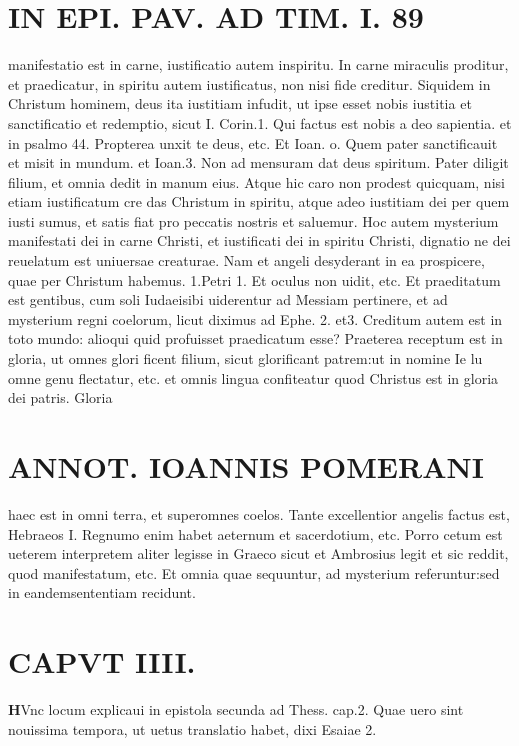 \documentclass{article}
\begin{document}
\begin{pages}
\section*{IN EPI. PAV. AD TIM. I. 89 }
\marginpar{[ p.89 ]}\pstart manifestatio est in carne, iustificatio autem inspiritu. In carne miraculis proditur, et praedicatur, in spiritu autem iustificatus, non nisi fide creditur. Siquidem in Christum hominem, deus ita iustitiam infudit, ut ipse esset nobis iustitia et sanctificatio et redemptio, sicut I. Corin.1. Qui factus est nobis a deo sapientia. et in psalmo 44. Propterea unxit te deus, etc. Et Ioan. o. Quem pater sanctificauit et misit in mundum. et Ioan.3. Non ad mensuram dat deus spiritum. Pater diligit filium, et omnia dedit in manum eius. Atque hic caro non prodest quicquam, nisi etiam iustificatum cre das Christum in spiritu, atque adeo iustitiam dei per quem iusti sumus, et satis fiat pro peccatis nostris et saluemur. Hoc autem mysterium manifestati dei in carne Christi, et iustificati dei in spiritu Christi, dignatio ne dei reuelatum est uniuersae creaturae. Nam et angeli desyderant in ea prospicere, quae per Christum habemus. 1.Petri 1. Et oculus non uidit, etc. Et praeditatum est gentibus, cum soli Iudaeisibi uiderentur ad Messiam pertinere, et ad mysterium regni coelorum, licut diximus ad Ephe. 2. et3. Creditum autem est in toto mundo: alioqui quid profuisset praedicatum esse? Praeterea receptum est in gloria, ut omnes glori ficent filium, sicut glorificant patrem:ut in nomine Ie lu omne genu flectatur, etc. et omnis lingua confiteatur quod Christus est in gloria dei patris. Gloria  \pend
\section*{ANNOT. IOANNIS POMERANI }\pstart haec est in omni terra, et superomnes coelos. Tante excellentior angelis factus est, Hebraeos I. Regnumo enim habet aeternum et sacerdotium, etc. Porro cetum est ueterem interpretem aliter legisse in Graeco sicut et Ambrosius legit et sic reddit, quod manifestatum, etc. Et omnia quae sequuntur, ad mysterium referuntur:sed in eandemsententiam recidunt.  \pend
\endnumbering\beginnumbering\section{CAPVT IIII.}\pstart \huge\textbf{H}\normalsize Vnc locum explicaui in epistola secunda ad Thess. cap.2. Quae uero sint nouissima tempora, ut uetus translatio habet, dixi Esaiae 2.  \pend
{}
{}

\end{pages}
\end{document}
